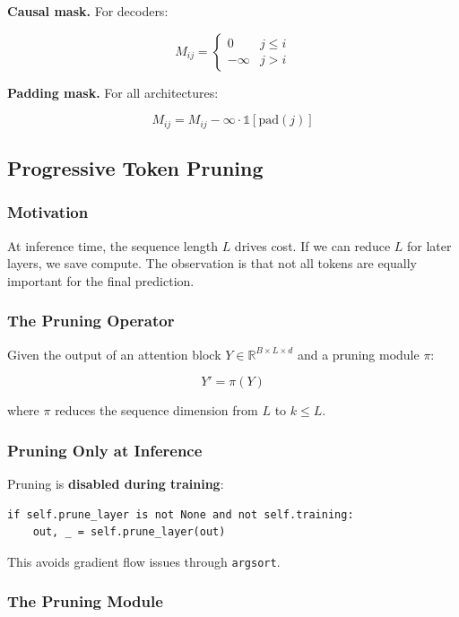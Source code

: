 \textbf{Causal mask.} For decoders:

\[
M_{ij} = \begin{cases} 0 & j \leq i \\ -\infty & j > i \end{cases}
\tag{4.3}
\]

\textbf{Padding mask.} For all architectures:

\[
M_{ij} = M_{ij} - \infty \cdot \mathbb{1}[\text{pad}(j)]
\tag{4.4}
\]

\subsection{Progressive Token Pruning}

\subsubsection{Motivation}

At inference time, the sequence length $L$ drives cost. If we can reduce $L$ 
for later layers, we save compute. The observation is that not all tokens 
are equally important for the final prediction.

\subsubsection{The Pruning Operator}

Given the output of an attention block $Y \in \mathbb{R}^{B \times L \times d}$ 
and a pruning module $\pi$:

\[
Y' = \pi(Y)
\tag{4.5}
\]

where $\pi$ reduces the sequence dimension from $L$ to $k \leq L$.

\subsubsection{Pruning Only at Inference}

Pruning is \textbf{disabled during training}:

\begin{lstlisting}
if self.prune_layer is not None and not self.training:
    out, _ = self.prune_layer(out)
\end{lstlisting}

This avoids gradient flow issues through \texttt{argsort}.

\subsubsection{The Pruning Module}

